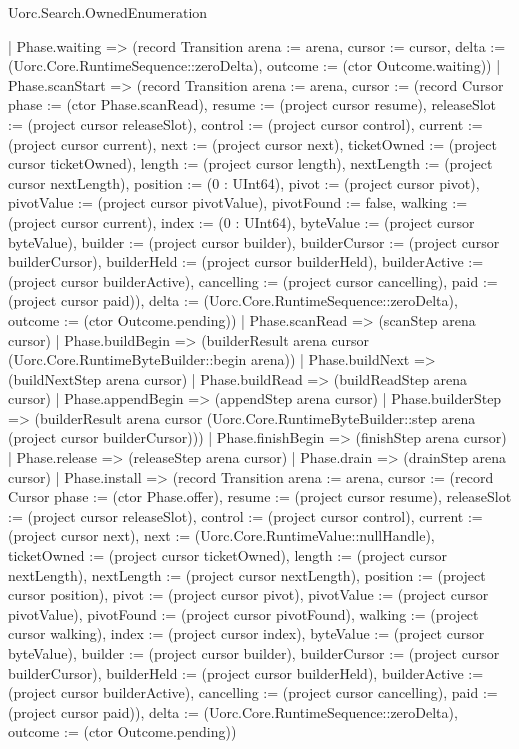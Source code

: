 \begin{lexlean}{Uorc.Search.OwnedEnumeration}
\begin{semanticmodule}
{    | Phase.waiting => (record Transition {arena := arena, cursor := cursor, delta := (Uorc.Core.RuntimeSequence::zeroDelta), outcome := (ctor Outcome.waiting)})
    | Phase.scanStart => (record Transition {arena := arena, cursor := (record Cursor {phase := (ctor Phase.scanRead), resume := (project cursor resume), releaseSlot := (project cursor releaseSlot), control := (project cursor control), current := (project cursor current), next := (project cursor next), ticketOwned := (project cursor ticketOwned), length := (project cursor length), nextLength := (project cursor nextLength), position := (0 : UInt64), pivot := (project cursor pivot), pivotValue := (project cursor pivotValue), pivotFound := false, walking := (project cursor current), index := (0 : UInt64), byteValue := (project cursor byteValue), builder := (project cursor builder), builderCursor := (project cursor builderCursor), builderHeld := (project cursor builderHeld), builderActive := (project cursor builderActive), cancelling := (project cursor cancelling), paid := (project cursor paid)}), delta := (Uorc.Core.RuntimeSequence::zeroDelta), outcome := (ctor Outcome.pending)})
    | Phase.scanRead => (scanStep arena cursor)
    | Phase.buildBegin => (builderResult arena cursor (Uorc.Core.RuntimeByteBuilder::begin arena))
    | Phase.buildNext => (buildNextStep arena cursor)
    | Phase.buildRead => (buildReadStep arena cursor)
    | Phase.appendBegin => (appendStep arena cursor)
    | Phase.builderStep => (builderResult arena cursor (Uorc.Core.RuntimeByteBuilder::step arena (project cursor builderCursor)))
    | Phase.finishBegin => (finishStep arena cursor)
    | Phase.release => (releaseStep arena cursor)
    | Phase.drain => (drainStep arena cursor)
    | Phase.install => (record Transition {arena := arena, cursor := (record Cursor {phase := (ctor Phase.offer), resume := (project cursor resume), releaseSlot := (project cursor releaseSlot), control := (project cursor control), current := (project cursor next), next := (Uorc.Core.RuntimeValue::nullHandle), ticketOwned := (project cursor ticketOwned), length := (project cursor nextLength), nextLength := (project cursor nextLength), position := (project cursor position), pivot := (project cursor pivot), pivotValue := (project cursor pivotValue), pivotFound := (project cursor pivotFound), walking := (project cursor walking), index := (project cursor index), byteValue := (project cursor byteValue), builder := (project cursor builder), builderCursor := (project cursor builderCursor), builderHeld := (project cursor builderHeld), builderActive := (project cursor builderActive), cancelling := (project cursor cancelling), paid := (project cursor paid)}), delta := (Uorc.Core.RuntimeSequence::zeroDelta), outcome := (ctor Outcome.pending)})
}
\end{semanticmodule}
\end{lexlean}
